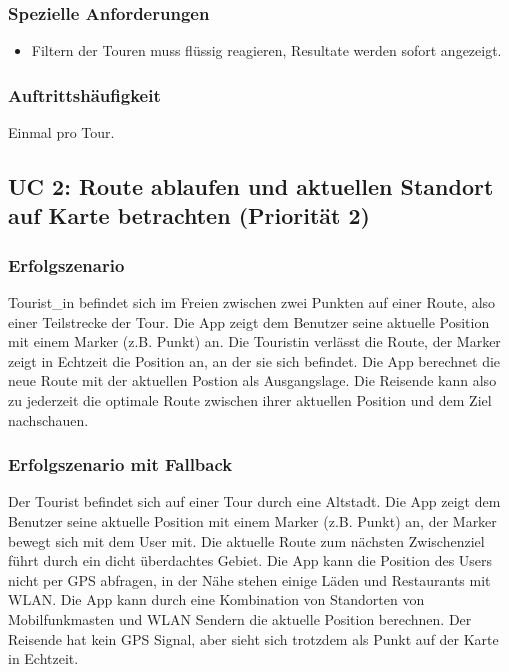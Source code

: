 \documentclass[a4paper,10pt,xetex]{article}
\begin{document}
\subsubsection{Spezielle Anforderungen}\label{spezielle-anforderungen}
\begin{itemize}
  \item Filtern der Touren muss flüssig reagieren, Resultate werden sofort angezeigt.
\end{itemize}


\subsubsection{Auftrittshäufigkeit}\label{auftrittshuxe4ufigkeit}
Einmal pro Tour.


\subsection{UC 2: Route ablaufen und aktuellen Standort auf Karte betrachten (Priorität 2)}\label{uc-2-user-luxe4uft-route-ab-und-sieht-seine-aktuellen-standort-auf-einer-karte-priorituxe4t-2}
\subsubsection{Erfolgszenario}\label{erfolgszenario}
Tourist\_in befindet sich im Freien zwischen zwei Punkten auf einer
Route, also einer Teilstrecke der Tour. Die App zeigt dem Benutzer seine
aktuelle Position mit einem Marker (z.B. Punkt) an. Die Touristin verlässt
die Route, der Marker zeigt in Echtzeit die Position an, an der sie sich
befindet. Die App berechnet die neue Route mit der aktuellen Postion als
Ausgangslage. Die Reisende kann also zu jederzeit die optimale Route
zwischen ihrer aktuellen Position und dem Ziel nachschauen.


\subsubsection{Erfolgszenario mit Fallback}\label{erfolgszenario-mit-fallback}
Der Tourist befindet sich auf einer Tour durch eine Altstadt. Die App
zeigt dem Benutzer seine aktuelle Position mit einem Marker (z.B. Punkt)
an, der Marker bewegt sich mit dem User mit. Die aktuelle Route zum
nächsten Zwischenziel führt durch ein dicht überdachtes Gebiet. Die App
kann die Position des Users nicht per GPS abfragen, in der Nähe stehen
einige Läden und Restaurants mit WLAN. Die App kann durch eine
Kombination von Standorten von Mobilfunkmasten und WLAN Sendern die
aktuelle Position berechnen. Der Reisende hat kein GPS Signal, aber
sieht sich trotzdem als Punkt auf der Karte in Echtzeit.
\end{document}
